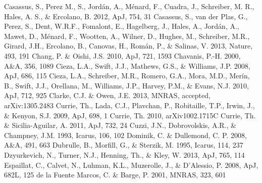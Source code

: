 \documentclass[apj]{emulateapj}
\begin{document}
\begin{thebibliography}{}
 Casassus, S., Perez M., S., Jord\'an, A., M\'enard, F., Cuadra, J., Schreiber, M. R., Hales, A. S., \& Ercolano, B. 2012, ApJ, 754, 31
 Casassus, S., van der Plas, G., Perez, S., Dent, W.R.F., Fomalont, E., Hagelberg, J., Hales, A., Jord\'an, A., Mawet, D., M\'enard, F., Wootten, A., Wilner, D., Hughes, M., Schreiber, M.R., Girard, J.H., Ercolano, B., Canovas, H., Rom\'an, P., \& Salinas, V. 2013, Nature, 493, 191
 Chang, P. \& Oishi, J.S. 2010, ApJ, 721, 1593
 Chavanis, P.-H. 2000, A\&A, 356, 1089
 Cieza, L.A., Swift, J.J., Mathews, G.S., \& Williams, J.P. 2008, ApJ, 686, 115
 Cieza, L.A., Schreiber, M.R., Romero, G.A., Mora, M.D., Mer\'in, B., Swift, J.J., Orellana, M., Williams, J.P., Harvey, P.M., \& Evans, N.J. 2010, ApJ, 712, 925
 Clarke, C.J. \& Owen, J.E. 2013, MNRAS, accepted, arXiv:1305.2483
 Currie, Th., Lada, C.J., Plavchan, P.,  Robitaille, T.P., Irwin, J., \& Kenyon, S.J. 2009, ApJ, 698, 1
 Currie, Th. 2010, arXiv1002.1715C	
 Currie, Th. \& Sicilia-Aguilar, A. 2011, ApJ, 732, 24
 Cuzzi, J.N., Dobrovolskis, A.R., \& Champney, J.M. 1993, Icarus, 106, 102
 Dominik, C. \& Dullemond, C. P. 2008, A\&A, 491, 663
 Dubrulle, B., Morfill, G., \& Sterzik, M. 1995, Icarus, 114, 237
 Dzyurkevich, N., Turner, N.J., Henning, Th., \& Kley, W. 2013, ApJ, 765, 114
 Espaillat, C., Calvet, N., Luhman, K.L., Muzerolle, J., \& D'Alessio, P. 2008, ApJ, 682L, 125
 de la Fuente Marcos, C. \& Barge, P. 2001, MNRAS, 323, 601 

\end{thebibliography}
\end{document}
